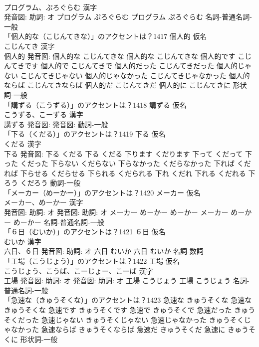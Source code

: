 \documentclass[8pt]{extreport}
\begin{document}
\begin{CJK}{UTF8}{min}
\\	プログラム、ぷろぐらむ 漢字　
\\	発音図: 助詞: オ	プログラム ぷろぐらむ		プログラム ぷろぐらむ				名詞-普通名詞-一般 
\\	「個人的な（こじんてきな）」のアクセントは？1417	個人的 仮名　
\\	こじんてき 漢字　
\\	個人的 発音図:	個人的な こじんてきな		個人的な こじんてきな 個人的です こじんてきです 個人的で こじんてきで 個人的だった こじんてきだった 個人的じゃない こじんてきじゃない 個人的じゃなかった こじんてきじゃなかった 個人的ならば こじんてきならば 個人的だ こじんてきだ 個人的に こじんてきに				形状詞-一般 
\\	「講ずる（こうずる）」のアクセントは？1418	講ずる 仮名　
\\	こうずる、こーずる 漢字　
\\	講ずる 発音図: 発音図:							動詞-一般 
\\	「下る（くだる）」のアクセントは？1419	下る 仮名　
\\	くだる 漢字　
\\	下る 発音図:	下る くだる		下る くだる 下ります くだります 下って くだって 下った くだった 下らない くだらない 下らなかった くだらなかった 下れば くだれば 下らせる くだらせる 下られる くだられる 下れ くだれ 下れる くだれる 下ろう くだろう				動詞-一般 
\\	「メーカー（めーかー）」のアクセントは？1420	メーカー 仮名　
\\	メーカー、めーかー 漢字　
\\	発音図: 助詞: オ 発音図: 助詞: オ	メーカー めーかー めーかー		メーカー めーかー めーかー				名詞-普通名詞-一般 
\\	「６日（むいか）」のアクセントは？1421	６日 仮名　
\\	むいか 漢字　
\\	六日、６日 発音図: 助詞: オ	六日 むいか		六日 むいか				名詞-数詞 
\\	「工場（こうじょう）」のアクセントは？1422	工場 仮名　
\\	こうじょう、こうば、こーじょー、こーば 漢字　
\\	工場 発音図: 助詞: オ 発音図: 助詞: オ	工場 こうじょう		工場 こうじょう				名詞-普通名詞-一般 
\\	「急速な（きゅうそくな）」のアクセントは？1423		急速な きゅうそくな		急速な きゅうそくな 急速です きゅうそくです 急速で きゅうそくで 急速だった きゅうそくだった 急速じゃない きゅうそくじゃない 急速じゃなかった きゅうそくじゃなかった 急速ならば きゅうそくならば 急速だ きゅうそくだ 急速に きゅうそくに				形状詞-一般 

\end{CJK}
\end{document}
